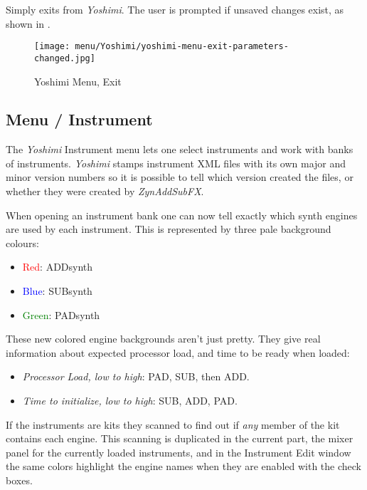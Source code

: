    Simply exits from \textsl{Yoshimi}.
   The user is prompted if unsaved changes exist, as shown in
   .

\begin{figure}[H]
   \centering 
   \texttt{[image: menu/Yoshimi/yoshimi-menu-exit-parameters-changed.jpg]}
   \caption[Yoshimi Menu, Exit]{Yoshimi Menu, Exit}
   \label{fig:yoshimi_change_exit}
\end{figure}

\subsection{Menu / Instrument}
\label{subsec:menu_instrument}

   The \textsl{Yoshimi} Instrument menu lets one select instruments and work
   with banks of instruments.
   \textsl{Yoshimi} stamps instrument XML files with its own major and minor
   version numbers so it is possible to tell which version created the files,
   or whether they were created by \textsl{ZynAddSubFX}.

   When opening an instrument bank one can now tell exactly which synth engines
   are used by each instrument. This is represented by three pale background
   colours:

   \begin{itemize}
      \item \textcolor{red}{Red}: ADDsynth
      \item \textcolor{blue}{Blue}: SUBsynth
      \item \textcolor{green}{Green}: PADsynth
   \end{itemize}

   These new colored engine backgrounds aren't just pretty. They give real
   information about expected processor load, and time to be ready when
   loaded:

   \begin{itemize}
      \item \textsl{Processor Load, low to high}: PAD, SUB, then ADD.
      \item \textsl{Time to initialize, low to high}: SUB, ADD, PAD.
   \end{itemize}

   If the instruments are kits they scanned to find out if 
   \textsl{any} member of the kit contains each engine.
   This scanning is duplicated in the current part, the mixer panel for the
   currently loaded instruments, and in the Instrument Edit window the same
   colors highlight the engine names when they are enabled with the check
   boxes. 

